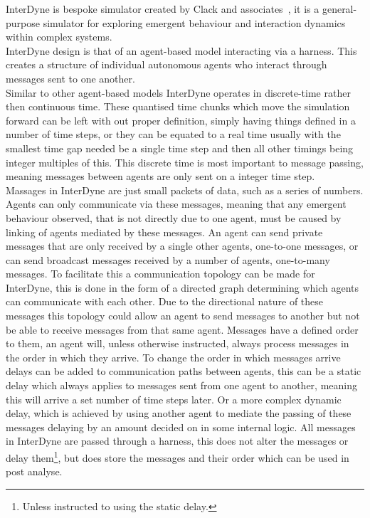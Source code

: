 \documentclass{article}
\begin{document}
InterDyne is bespoke simulator created by Clack and associates~\cite{Chris_webPage}, it is a general-purpose simulator for exploring emergent behaviour and interaction dynamics within complex systems.\\
InterDyne design is that of an agent-based model interacting via a harness. This creates a structure of individual autonomous agents who interact through messages sent to one another.\\ 
Similar to other agent-based models InterDyne operates in discrete-time rather then continuous time. These quantised time chunks which move the simulation forward can be left with out proper definition, simply having things defined in a number of time steps, or they can be equated to a real time usually with the smallest time gap needed be a single time step and then all other timings being integer multiples of this. This discrete time is most important to message passing, meaning messages between agents are only sent on a integer time step.\\ 
Massages in InterDyne are just small packets of data, such as a series of numbers.  Agents can only communicate via these messages, meaning that any emergent behaviour observed, that is not directly due to one agent, must be caused by linking of agents mediated by these messages. An agent can send private messages that are only received by a single other agents, one-to-one messages, or can send broadcast messages received by a number of agents, one-to-many messages. To facilitate this a communication topology can be made for InterDyne, this is done in the form of a directed graph determining which agents can communicate with each other. Due to the directional nature of these messages this topology could allow an agent to send messages to another but not be able to receive messages from that same agent. Messages have a defined order to them, an agent will, unless otherwise instructed, always process messages in the order in which they arrive. To change the order in which messages arrive delays can be added to communication paths between agents, this can be a static delay which always applies to messages sent from one agent to another, meaning this will arrive a set number of time steps later. Or a more complex dynamic delay, which is achieved by using another agent to mediate the passing of these messages delaying by an amount decided on in some internal logic. All messages in InterDyne are passed through a harness, this does not alter the messages or delay them\footnote{Unless instructed to using the static delay.}, but does store the messages and their order which can be used in post analyse.\\         
\end{document}
